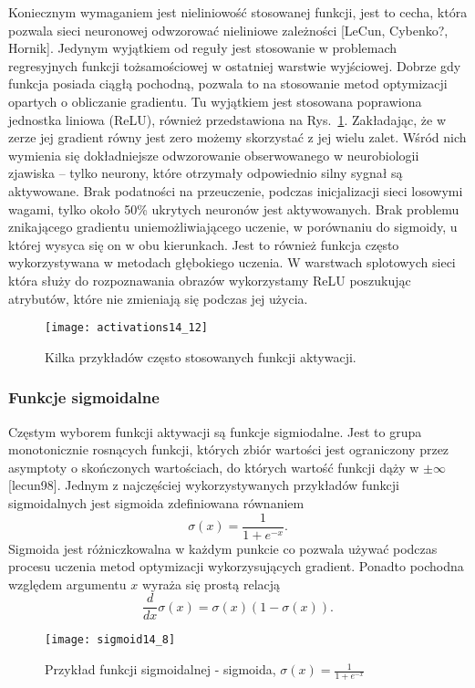 \documentclass[11pt]{book}
\theoremstyle{definition}
\begin{document}
Koniecznym wymaganiem jest nieliniowość stosowanej funkcji, jest to cecha, która pozwala sieci neuronowej odwzorować nieliniowe zależności [LeCun, Cybenko?, Hornik]. Jedynym wyjątkiem od reguły jest stosowanie w problemach regresyjnych funkcji tożsamościowej w ostatniej warstwie wyjściowej. Dobrze gdy funkcja posiada ciągłą pochodną, pozwala to na stosowanie metod optymizacji opartych o obliczanie gradientu. Tu wyjątkiem jest stosowana poprawiona jednostka liniowa (ReLU), również przedstawiona na Rys.~\ref{fig:activations}. Zakładając, że w zerze jej gradient równy jest zero możemy skorzystać z jej wielu zalet. Wśród nich wymienia się dokładniejsze odwzorowanie obserwowanego w neurobiologii zjawiska -- tylko neurony, które otrzymały odpowiednio silny sygnał są aktywowane. Brak podatności na przeuczenie, podczas inicjalizacji sieci losowymi wagami, tylko około 50\% ukrytych neuronów jest aktywowanych. Brak problemu znikającego gradientu uniemożliwiającego uczenie, w porównaniu do sigmoidy, u której wysyca się on w obu kierunkach. Jest to również funkcja często wykorzystywana w metodach głębokiego uczenia. W warstwach splotowych sieci która służy do rozpoznawania obrazów wykorzystamy ReLU poszukując atrybutów, które nie zmieniają się podczas jej użycia.
%
\begin{figure}[h!]
	\centering
	\texttt{[image: activations14\_12]}
	\caption{Kilka przykładów często stosowanych funkcji aktywacji.}
	\label{fig:activations}
\end{figure}
%
%
\subsubsection{Funkcje sigmoidalne}
%
Częstym wyborem funkcji aktywacji są funkcje sigmiodalne. Jest to grupa monotonicznie rosnących funkcji, których zbiór wartości jest ograniczony przez asymptoty o skończonych wartościach, do których wartość funkcji dąży w $\pm \infty$ [lecun98]. Jednym z najczęściej wykorzystywanych przykładów funkcji sigmoidalnych jest sigmoida zdefiniowana równaniem
%
\begin{equation}
\sigma(x) = \frac{1}{1+e^{-x}}.
\end{equation}
%
Sigmoida jest różniczkowalna w każdym punkcie co pozwala używać podczas procesu uczenia metod optymizacji wykorzysujących gradient. Ponadto pochodna względem argumentu $x$ wyraża się prostą relacją
%
\begin{equation}
\frac{d}{dx} \sigma(x)= \sigma(x)\left(1 - \sigma(x)\right).
\end{equation}
%
%
\begin{figure}[h!]
	\centering
	\texttt{[image: sigmoid14\_8]}
	\caption{Przykład funkcji sigmoidalnej - sigmoida, $\sigma(x) = \frac{1}{1+e^{-x}}$}
\end{figure} 
\end{document}
